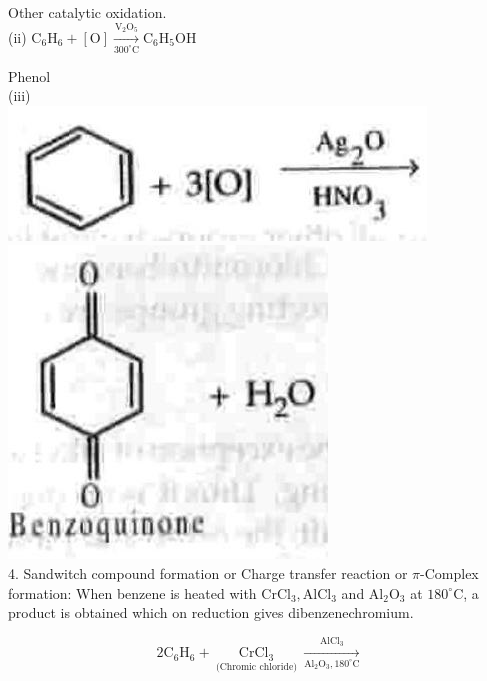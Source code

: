 \documentclass[10pt]{article}
\begin{document}
Other catalytic oxidation.\\
(ii) $\mathrm{C}_{6} \mathrm{H}_{6}+[\mathrm{O}] \xrightarrow[300^{\circ} \mathrm{C}]{\mathrm{V}_{2} \mathrm{O}_{5}} \mathrm{C}_{6} \mathrm{H}_{5} \mathrm{OH}$

Phenol\\
(iii)\\
\includegraphics[max width=\textwidth, center]{2025_01_28_8470952b98110cec3aabg-211}\\
\includegraphics[max width=\textwidth, center]{2025_01_28_8470952b98110cec3aabg-211(2)}\\
4. Sandwitch compound formation or Charge transfer reaction or $\pi$-Complex formation: When benzene is heated with $\mathrm{CrCl}_{3}, \mathrm{AlCl}_{3}$ and $\mathrm{Al}_{2} \mathrm{O}_{3}$ at $180^{\circ} \mathrm{C}$, a product is obtained which on reduction gives dibenzenechromium.

$$
2 \mathrm{C}_{6} \mathrm{H}_{6}+\underset{\text { (Chromic chloride) }}{\mathrm{CrCl}_{3}} \xrightarrow[\mathrm{Al}_{2} \mathrm{O}_{3}, 180^{\circ} \mathrm{C}]{\mathrm{AlCl}_{3}}
$$
\end{document}
